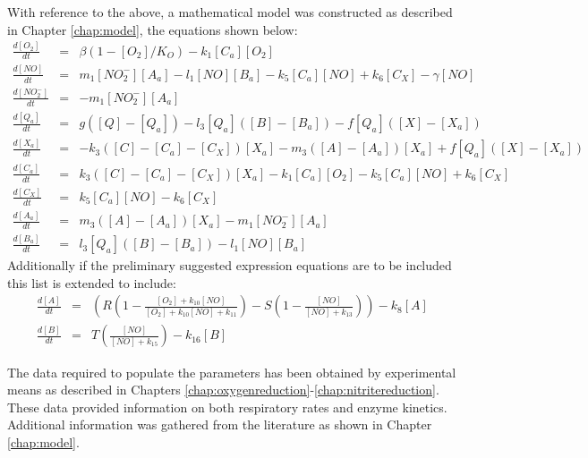\noindent With reference to the above, a mathematical model was constructed as described in Chapter \ref{chap:model}, the equations shown below:
\begin{eqnarray*}
\frac{d[O_2]}{dt} & = & \beta(1-[O_2]/K_O) - k_{1}[C_a][O_2]\\ \nonumber
\frac{d[NO]}{dt} & = & m_{1}[NO_2^-][A_a] - l_1[NO][B_a] - k_5[C_a][NO] + k_6 [C_X] - \gamma[NO]\\ \nonumber
\frac{d[NO_2^-]}{dt} & = & - m_{1}[NO_2^-][A_a]\\ \nonumber
\frac{d[Q_a]}{dt} & = & g([Q] - [Q_a]) - l_3[Q_a]([B] - [B_a]) - f[Q_a]([X]-[X_a])\\ \nonumber
\frac{d[X_a]}{dt} & = & -k_3([C] - [C_a] - [C_X])[X_a]  - m_3([A] - [A_a])[X_a] + f[Q_a]([X]-[X_a])\\ \nonumber
\frac{d[C_a]}{dt} & = & k_3([C] - [C_a] - [C_X])[X_a] - k_{1}[C_a][O_2] - k_5[C_a][NO] + k_6[C_X]\\ \nonumber
\frac{d[C_X]}{dt} & = & k_5[C_a][NO] - k_6 [C_X]\\ \nonumber
\frac{d[A_a]}{dt} & = & m_3([A] - [A_a])[X_a]- m_{1}[NO_2^-][A_a]\\ \nonumber
\frac{d[B_a]}{dt} & = & l_3[Q_a]([B] - [B_a]) - l_1[NO][B_a]
\end{eqnarray*}
Additionally if the preliminary suggested expression equations are to be included this list is extended to include:
\begin{eqnarray*}
\frac{d[A]}{dt} & = & \left(R\left(1 - \frac{[O_2] + k_{10}[NO]}{[O_2] + k_{10}[NO] + k_{11}}\right) - S\left(1 - \frac{[NO]}{[NO] + k_{13}}\right)\right) - k_8[A] \nonumber \\
\frac{d[B]}{dt} & = & T \left(\frac{[NO]}{[NO] + k_{15}}\right) - k_{16}[B]
\end{eqnarray*}

The data required to populate the parameters has been obtained by experimental means as described in Chapters \ref{chap:oxygenreduction}-\ref{chap:nitritereduction}. These data provided information on both respiratory rates and enzyme kinetics. Additional information was gathered from the literature as shown in Chapter \ref{chap:model}.

